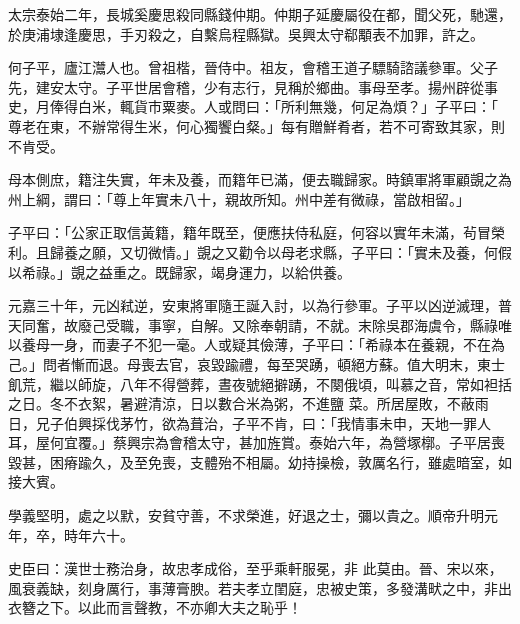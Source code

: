 \begin{pinyinscope}
 太宗泰始二年，長城奚慶思殺同縣錢仲期。仲期子延慶屬役在都，聞父死，馳還，於庚浦埭逢慶思，手刃殺之，自繫烏程縣獄。吳興太守郗顒表不加罪，許之。



 何子平，廬江灊人也。曾祖楷，晉侍中。祖友，會稽王道子驃騎諮議參軍。父子先，建安太守。子平世居會稽，少有志行，見稱於鄉曲。事母至孝。揚州辟從事史，月俸得白米，輒貨市粟麥。人或問曰：「所利無幾，何足為煩？」子平曰：「
 尊老在東，不辦常得生米，何心獨饗白粲。」每有贈鮮肴者，若不可寄致其家，則不肯受。



 母本側庶，籍注失實，年未及養，而籍年已滿，便去職歸家。時鎮軍將軍顧覬之為州上綱，謂曰：「尊上年實未八十，親故所知。州中差有微祿，當啟相留。」



 子平曰：「公家正取信黃籍，籍年既至，便應扶侍私庭，何容以實年未滿，茍冒榮利。且歸養之願，又切微情。」覬之又勸令以母老求縣，子平曰：「實未及養，何假以希祿。」覬之益重之。既歸家，竭身運力，以給供養。



 元嘉三十年，元凶弒逆，安東將軍隨王誕入討，以為行參軍。子平以凶逆滅理，普天同奮，故廢己受職，事寧，自解。又除奉朝請，不就。末除吳郡海虞令，縣祿唯以養母一身，而妻子不犯一毫。人或疑其儉薄，子平曰：「希祿本在養親，不在為己。」問者慚而退。母喪去官，哀毀踰禮，每至哭踴，頓絕方蘇。值大明末，東士飢荒，繼以師旋，八年不得營葬，晝夜號絕擗踴，不闋俄頃，叫慕之音，常如袒括之日。冬不衣絮，暑避清涼，日以數合米為粥，不進鹽
 菜。所居屋敗，不蔽雨日，兄子伯興採伐茅竹，欲為葺治，子平不肯，曰：「我情事未申，天地一罪人耳，屋何宜覆。」蔡興宗為會稽太守，甚加旌賞。泰始六年，為營塚槨。子平居喪毀甚，困瘠踰久，及至免喪，支體殆不相屬。幼持操檢，敦厲名行，雖處暗室，如接大賓。



 學義堅明，處之以默，安貧守善，不求榮進，好退之士，彌以貴之。順帝升明元年，卒，時年六十。



 史臣曰：漢世士務治身，故忠孝成俗，至乎乘軒服冕，非
 此莫由。晉、宋以來，風衰義缺，刻身厲行，事薄膏腴。若夫孝立閨庭，忠被史策，多發溝畎之中，非出衣簪之下。以此而言聲教，不亦卿大夫之恥乎！



\end{pinyinscope}